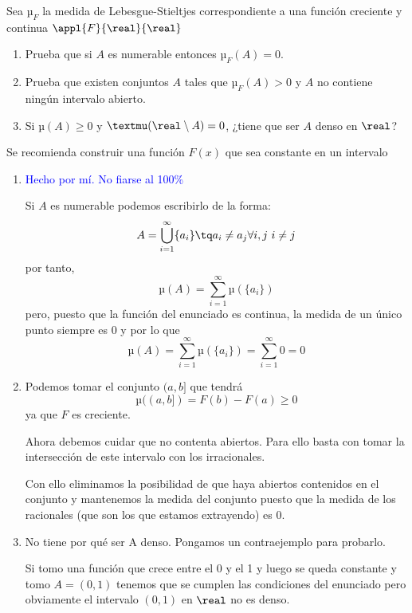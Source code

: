 \begin{problem}
Sea $µ_F$ la medida de Lebesgue-Stieltjes correspondiente a una función creciente y continua $\appl{F}{\real}{\real}$
\begin{enumerate}
\item Prueba que si $A$ es numerable entonces $µ_F(A)=0$.
\item Prueba que existen conjuntos $A$ tales que $µ_F(A)> 0$ y $A$ no contiene ningún intervalo abierto.
\item Si $µ(A)\geq 0$ y $µ(\real \setminus A) = 0$, ¿tiene que ser $A$ denso en $\real$?
\end{enumerate}
\obs Se recomienda construir una función $F(x)$ que sea constante en un intervalo
\solution

\begin{enumerate}
\item \textcolor{blue}{Hecho por mí. No fiarse al 100\%}

Si $A$ es numerable podemos escribirlo de la forma:
\[A = \bigcup_{i=1}^{\infty}\{a_i\} \tq a_i \neq a_j \forall i, j \ i \neq j\]
por tanto,
\[µ(A) = \sum_{i=1}^{\infty} µ(\{a_i\}) \]
pero, puesto que la función del enunciado es continua, la medida de un único punto siempre es 0 y por lo que
\[µ(A) = \sum_{i=1}^{\infty} µ(\{a_i\}) = \sum_{i=1}^{\infty}  0 = 0\]

\item Podemos tomar el conjunto $(a, b]$ que tendrá
\[µ((a,b]) = F(b)-F(a) \geq 0\]
ya que $F$ es creciente.

Ahora debemos cuidar que no contenta abiertos. Para ello basta con tomar la intersección de este intervalo con los irracionales.

Con ello eliminamos la posibilidad de que haya abiertos contenidos en el conjunto y mantenemos la medida del conjunto puesto que la medida de los racionales (que son los que estamos extrayendo) es 0.

\item No tiene por qué ser A denso. Pongamos un contraejemplo para probarlo.

Si tomo una función que crece entre el 0 y el 1 y luego se queda constante y tomo $A=(0,1)$ tenemos que se cumplen las condiciones del enunciado pero obviamente el intervalo $(0,1)$ en $\real$ no es denso.
\end{enumerate}
\end{problem}

